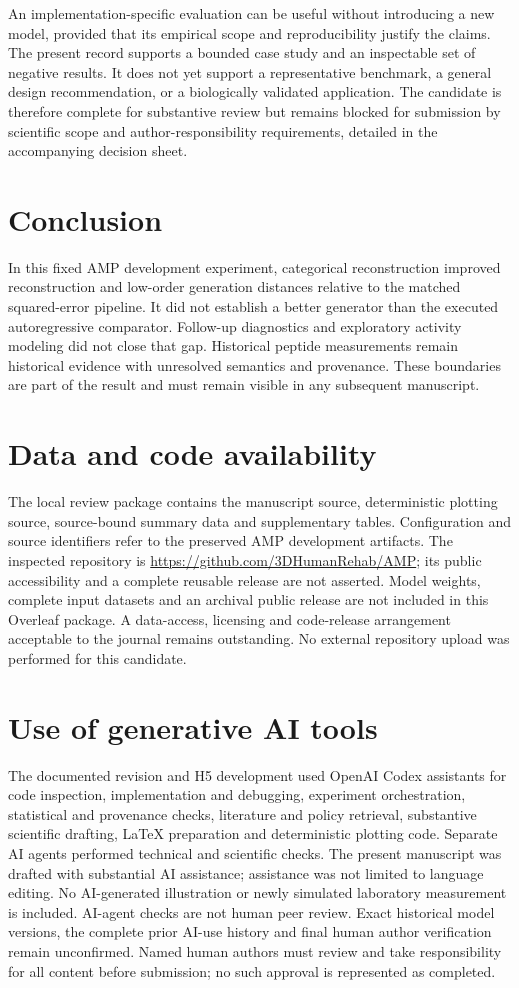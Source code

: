 \documentclass[12pt,a4paper]{article}
\begin{document}
An implementation-specific evaluation can be useful without introducing a new model, provided that its empirical scope and reproducibility justify the claims. The present record supports a bounded case study and an inspectable set of negative results. It does not yet support a representative benchmark, a general design recommendation, or a biologically validated application. The candidate is therefore complete for substantive review but remains blocked for submission by scientific scope and author-responsibility requirements, detailed in the accompanying decision sheet.

\section{Conclusion}
In this fixed AMP development experiment, categorical reconstruction improved reconstruction and low-order generation distances relative to the matched squared-error pipeline. It did not establish a better generator than the executed autoregressive comparator. Follow-up diagnostics and exploratory activity modeling did not close that gap. Historical peptide measurements remain historical evidence with unresolved semantics and provenance. These boundaries are part of the result and must remain visible in any subsequent manuscript.

\section*{Data and code availability}
The local review package contains the manuscript source, deterministic plotting source, source-bound summary data and supplementary tables. Configuration and source identifiers refer to the preserved AMP development artifacts. The inspected repository is \url{https://github.com/3DHumanRehab/AMP}; its public accessibility and a complete reusable release are not asserted. Model weights, complete input datasets and an archival public release are not included in this Overleaf package. A data-access, licensing and code-release arrangement acceptable to the journal remains outstanding. No external repository upload was performed for this candidate.

\section*{Use of generative AI tools}
The documented revision and H5 development used OpenAI Codex assistants for code inspection, implementation and debugging, experiment orchestration, statistical and provenance checks, literature and policy retrieval, substantive scientific drafting, LaTeX preparation and deterministic plotting code. Separate AI agents performed technical and scientific checks. The present manuscript was drafted with substantial AI assistance; assistance was not limited to language editing. No AI-generated illustration or newly simulated laboratory measurement is included. AI-agent checks are not human peer review. Exact historical model versions, the complete prior AI-use history and final human author verification remain unconfirmed. Named human authors must review and take responsibility for all content before submission; no such approval is represented as completed.
\end{document}
